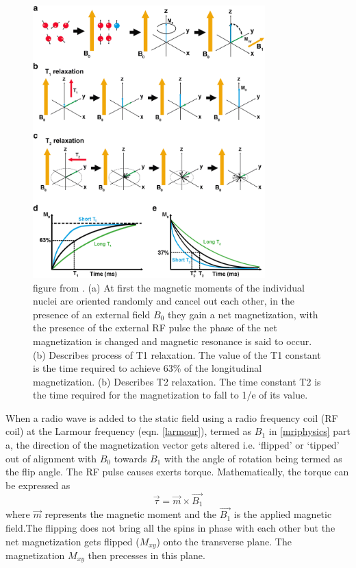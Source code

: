 \documentclass[msthesis.tex]{subfiles}
\begin{document}
\begin{figure}
\includegraphics[width=0.8\textwidth]{images/mri1.png}
\caption{figure from \cite{Mastrogiacomo2019}. (a) At first the magnetic moments of the individual nuclei are oriented randomly and cancel out each other, in the presence of an external field $B_0$ they gain a net magnetization, with the presence of the external RF pulse the phase of the net magnetization is changed and magnetic resonance is said to occur. (b) Describes process of T1 relaxation. The value of the T1 constant is the time required to achieve 63\% of the longitudinal magnetization. (b) Describes T2 relaxation. The time constant T2 is the time required for the magnetization to fall to 1/e of its value.}
\label{mriphysics}
\end{figure}

When a radio wave is added to the static field using a radio frequency coil (RF coil) at the Larmour frequency (eqn. \autoref{larmour}), termed as $B_1$ in \autoref{mriphysics} part a, the direction of the magnetization vector gets altered i.e. ‘flipped’ or ‘tipped’ out of alignment with $B_0$ towards $B_1$ with the angle of rotation being termed as the flip angle. The RF pulse causes exerts torque. Mathematically, the torque can be expressed as
\begin{equation}
    \Vec{\tau} = \Vec{m} \times \Vec{B_1}
\end{equation}
where $\Vec{m}$ represents the magnetic moment and the $ \Vec{B_1}$ is the applied magnetic field.The flipping does not bring all the spins in phase with each other but the net magnetization gets flipped ($M_{xy}$) onto the transverse plane. The magnetization $M_{xy}$ then precesses in this plane.
\end{document}
